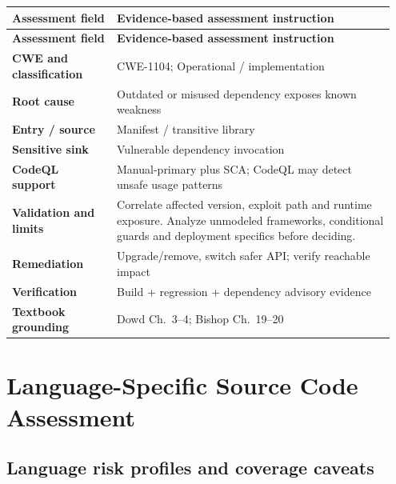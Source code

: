 \documentclass[11pt,letterpaper,oneside]{book}
\begin{document}
\small
\setlength{\tabcolsep}{2pt}
\renewcommand{\arraystretch}{1.18}
\begin{longtable}{>{\raggedright\arraybackslash}p{0.26\linewidth}>{\raggedright\arraybackslash}p{0.69\linewidth}}
\toprule
\textbf{Assessment field} & \textbf{Evidence-based assessment instruction}\\
\midrule
\endfirsthead
\toprule
\textbf{Assessment field} & \textbf{Evidence-based assessment instruction}\\
\midrule
\endhead
\textbf{CWE and classification} & CWE-1104; Operational / implementation\\
\textbf{Root cause} & Outdated or misused dependency exposes known weakness\\
\textbf{Entry / source} & Manifest / transitive library\\
\textbf{Sensitive sink} & Vulnerable dependency invocation\\
\textbf{CodeQL support} & Manual-primary plus SCA; CodeQL may detect unsafe usage patterns\\
\textbf{Validation and limits} & Correlate affected version, exploit path and runtime exposure. Analyze unmodeled frameworks, conditional guards and deployment specifics before deciding.\\
\textbf{Remediation} & Upgrade/remove, switch safer API; verify reachable impact\\
\textbf{Verification} & Build + regression + dependency advisory evidence\\
\textbf{Textbook grounding} & Dowd Ch.~3--4; Bishop Ch.~19--20\\
\bottomrule
\end{longtable}
\normalsize

\chapter{Language-Specific Source Code Assessment}

\section{Language risk profiles and coverage caveats}
\end{document}
